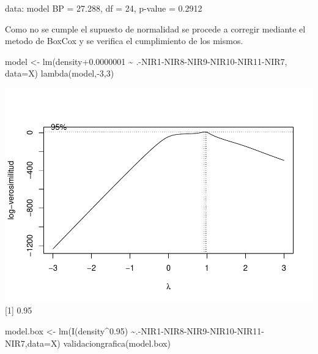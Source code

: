 \documentclass[
]{article}
\newenvironment{Shaded}{\begin{snugshade}}{\end{snugshade}}
\newcommand{\AttributeTok}[1]{\textcolor[rgb]{0.77,0.63,0.00}{#1}}
\newcommand{\DecValTok}[1]{\textcolor[rgb]{0.00,0.00,0.81}{#1}}
\newcommand{\FloatTok}[1]{\textcolor[rgb]{0.00,0.00,0.81}{#1}}
\newcommand{\FunctionTok}[1]{\textcolor[rgb]{0.00,0.00,0.00}{#1}}
\newcommand{\NormalTok}[1]{#1}
\newcommand{\OtherTok}[1]{\textcolor[rgb]{0.56,0.35,0.01}{#1}}
\newcommand{\SpecialCharTok}[1]{\textcolor[rgb]{0.00,0.00,0.00}{#1}}
\begin{document}
data: model BP = 27.288, df = 24, p-value = 0.2912

Como no se cumple el supuesto de normalidad se procede a corregir
mediante el metodo de BoxCox y se verifica el cumplimiento de los
mismos.

\begin{Shaded}
\begin{Highlighting}[]
\NormalTok{model }\OtherTok{\textless{}{-}} \FunctionTok{lm}\NormalTok{(density}\FloatTok{+0.0000001} \SpecialCharTok{\textasciitilde{}}\NormalTok{ .}\SpecialCharTok{{-}}\NormalTok{NIR1}\SpecialCharTok{{-}}\NormalTok{NIR8}\SpecialCharTok{{-}}\NormalTok{NIR9}\SpecialCharTok{{-}}\NormalTok{NIR10}\SpecialCharTok{{-}}\NormalTok{NIR11}\SpecialCharTok{{-}}\NormalTok{NIR7, }\AttributeTok{data=}\NormalTok{X)}
\FunctionTok{lambda}\NormalTok{(model,}\SpecialCharTok{{-}}\DecValTok{3}\NormalTok{,}\DecValTok{3}\NormalTok{)}
\end{Highlighting}
\end{Shaded}

\includegraphics{Taller-2-Regresion-Multiple-Aplicada_files/figure-latex/unnamed-chunk-5-1.pdf}
{[}1{]} 0.95

\begin{Shaded}
\begin{Highlighting}[]
\NormalTok{model.box }\OtherTok{\textless{}{-}} \FunctionTok{lm}\NormalTok{(}\FunctionTok{I}\NormalTok{(density}\SpecialCharTok{\^{}}\FloatTok{0.95}\NormalTok{) }\SpecialCharTok{\textasciitilde{}}\NormalTok{.}\SpecialCharTok{{-}}\NormalTok{NIR1}\SpecialCharTok{{-}}\NormalTok{NIR8}\SpecialCharTok{{-}}\NormalTok{NIR9}\SpecialCharTok{{-}}\NormalTok{NIR10}\SpecialCharTok{{-}}\NormalTok{NIR11}\SpecialCharTok{{-}}\NormalTok{NIR7,}\AttributeTok{data=}\NormalTok{X)}
\FunctionTok{validaciongrafica}\NormalTok{(model.box)}
\end{Highlighting}
\end{Shaded}
\end{document}

